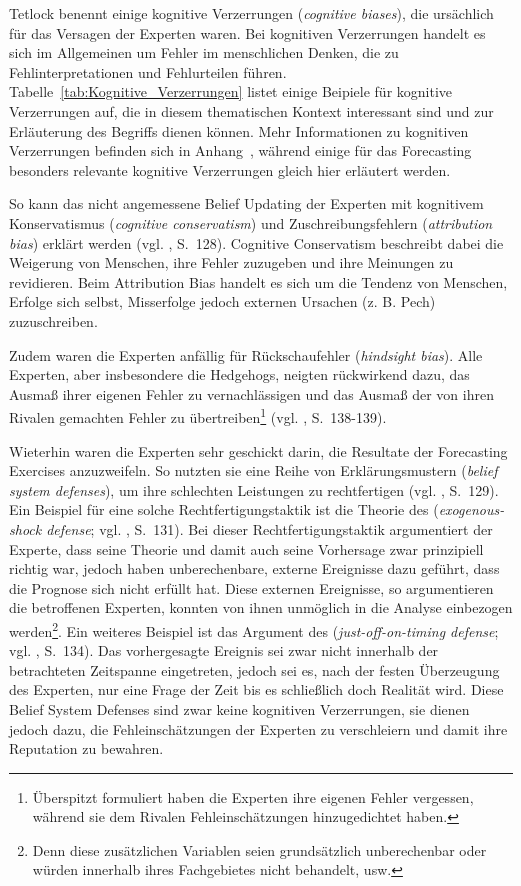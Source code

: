 Tetlock benennt einige kognitive Verzerrungen (\emph{cognitive biases}),
die ursächlich für das Versagen der Experten waren. Bei kognitiven Verzerrungen
handelt es sich im Allgemeinen um Fehler im menschlichen Denken, die zu
Fehlinterpretationen und Fehlurteilen führen.
Tabelle~\ref{tab:Kognitive_Verzerrungen} listet einige Beipiele für kognitive
Verzerrungen auf, die in diesem thematischen Kontext interessant sind und zur
Erläuterung des Begriffs dienen können. Mehr Informationen zu kognitiven
Verzerrungen befinden sich in Anhang~\xcom, während einige für das Forecasting
besonders relevante kognitive Verzerrungen gleich hier erläutert werden.

So kann das nicht angemessene Belief Updating der Experten mit kognitivem
Konservatismus (\emph{cognitive conservatism}) und Zuschreibungsfehlern 
(\emph{attribution bias}) erklärt werden (vgl. \cite{Tetlock}, S.~128).
Cognitive Conservatism beschreibt dabei die Weigerung von Menschen, ihre Fehler
zuzugeben und ihre Meinungen zu revidieren. Beim Attribution Bias handelt es
sich um die Tendenz von Menschen, Erfolge sich selbst, Misserfolge jedoch
externen Ursachen (z. B. Pech) zuzuschreiben.

Zudem waren die Experten anfällig für Rückschaufehler (\emph{hindsight bias}).
Alle Experten, aber insbesondere die Hedgehogs, neigten rückwirkend dazu, das Ausmaß ihrer
eigenen Fehler zu vernachlässigen und das Ausmaß der von ihren Rivalen gemachten Fehler zu
übertreiben\footnote{
Überspitzt formuliert haben die Experten ihre eigenen Fehler vergessen, während
sie dem Rivalen Fehleinschätzungen hinzugedichtet haben.
} (vgl. \cite{Tetlock}, S.~138-139).

Wieterhin waren die Experten sehr geschickt darin, die Resultate der Forecasting
Exercises anzuzweifeln. So nutzten sie eine Reihe von Erklärungsmustern
(\emph{belief system defenses}), um ihre schlechten Leistungen zu rechtfertigen
(vgl. \cite{Tetlock}, S.~129). Ein Beispiel für eine solche
Rechtfertigungstaktik ist die Theorie des \grqq{}
(\emph{exogenous-shock defense}; vgl. \cite{Tetlock}, S.~131). Bei dieser
Rechtfertigungstaktik argumentiert der Experte, dass seine Theorie und damit
auch seine Vorhersage zwar prinzipiell richtig war, jedoch haben unberechenbare,
externe Ereignisse dazu geführt, dass die Prognose sich nicht erfüllt hat. Diese
externen Ereignisse, so argumentieren die betroffenen Experten, konnten von
ihnen unmöglich in die Analyse einbezogen werden\footnote{
Denn diese zusätzlichen Variablen seien grundsätzlich unberechenbar oder würden
innerhalb ihres Fachgebietes nicht behandelt, usw.
}. Ein weiteres Beispiel ist das Argument des \grqq{}
(\emph{just-off-on-timing defense}; vgl. \cite{Tetlock}, S.~134). Das
vorhergesagte Ereignis sei zwar nicht innerhalb der betrachteten Zeitspanne 
eingetreten, jedoch sei es, nach der festen Überzeugung des Experten, nur eine
Frage der Zeit bis es schließlich doch Realität wird. Diese Belief System
Defenses sind zwar keine kognitiven Verzerrungen, sie dienen jedoch dazu, die
Fehleinschätzungen der Experten zu verschleiern und damit ihre Reputation zu
bewahren.

